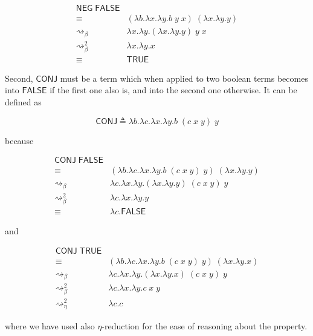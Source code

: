 \documentclass{article}
\begin{document}
\begin{align*}
  \mathsf{NEG}\;\mathsf{FALSE} & \\
    \equiv&
      (\lambda b.\lambda x.\lambda y.b\;y\;x)\;
      (\lambda x.\lambda y.y) \\
    \rightsquigarrow_\beta&
      \lambda x.\lambda y.(
        \lambda x.\lambda y.y
      )\;
      y\;
      x \\ 
    \rightsquigarrow_\beta^2&
      \lambda x.\lambda y.x \\ 
    \equiv& \mathsf{TRUE}
\end{align*}

Second, $\mathsf{CONJ}$ must be a term which when applied to two 
boolean terms becomes into $\mathsf{FALSE}$ if the first one 
also is, and into the second one otherwise. It can be defined 
as

$$
\mathsf{CONJ} 
  \triangleq \lambda b.\lambda c.\lambda x.\lambda y.
    b\;(c\;x\;y)\;y
$$

because

\begin{align*}
  \mathsf{CONJ}\;\mathsf{FALSE} & \\
    \equiv&
      (\lambda b.\lambda c.\lambda x.\lambda y.b\;(c\;x\;y)\;y)\;
      (\lambda x.\lambda y.y) \\
    \rightsquigarrow_\beta&
      \lambda c.\lambda x.\lambda y.
        (\lambda x.\lambda y.y)\;(c\;x\;y)\;y \\
    \rightsquigarrow_\beta^2&
      \lambda c.\lambda x.\lambda y.y \\
    \equiv&
      \lambda c.\mathsf{FALSE}
\end{align*}

and 

\begin{align*}
  \mathsf{CONJ}\;\mathsf{TRUE} & \\
    \equiv&
      (\lambda b.\lambda c.\lambda x.\lambda y.b\;(c\;x\;y)\;y)\;
      (\lambda x.\lambda y.x) \\
    \rightsquigarrow_\beta&
      \lambda c.\lambda x.\lambda y.
        (\lambda x.\lambda y.x)\;(c\;x\;y)\;y \\
    \rightsquigarrow_\beta^2&
      \lambda c.\lambda x.\lambda y.c\;x\;y \\
    \rightsquigarrow_\eta^2&
      \lambda c.c
\end{align*}

where we have used also $\eta$-reduction for the ease of 
reasoning about the property.
\end{document}
